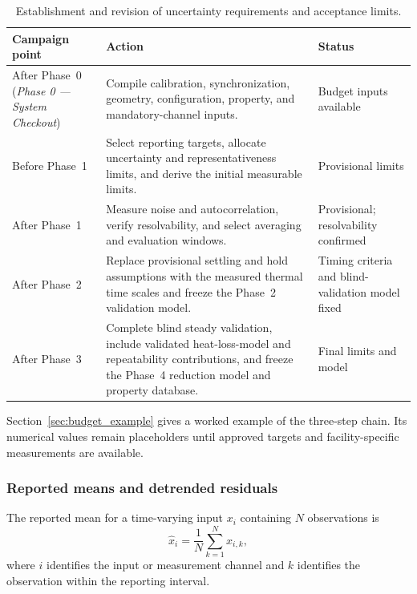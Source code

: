 \documentclass[11pt]{article}
\newcommand{\PhaseZeroDoc}{\textit{Phase 0 --- System Checkout}}
\begin{document}
\begin{table}[H]
    \centering
    \caption{Establishment and revision of uncertainty requirements and acceptance limits.}
    \label{tab:budget_schedule}
    {\small
    \begin{tabularx}{\textwidth}{
        @{}
        >{\raggedright\arraybackslash}p{1.30in}
        >{\raggedright\arraybackslash}X
        >{\raggedright\arraybackslash}p{1.55in}
        @{}
    }
        \toprule
        \textbf{Campaign point} &
        \textbf{Action} &
        \textbf{Status} \\
        \midrule

        After Phase~0 (\PhaseZeroDoc) &
        Compile calibration, synchronization, geometry, configuration, property, and mandatory-channel inputs. &
        Budget inputs available \\

        Before Phase~1 &
        Select reporting targets, allocate uncertainty and representativeness limits, and derive the initial measurable limits. &
        Provisional limits \\

        After Phase~1 &
        Measure noise and autocorrelation, verify resolvability, and select averaging and evaluation windows. &
        Provisional; resolvability confirmed \\

        After Phase~2 &
        Replace provisional settling and hold assumptions with the measured thermal time scales and freeze the Phase~2 validation model. &
        Timing criteria and blind-validation model fixed \\

        After Phase~3 &
        Complete blind steady validation, include validated heat-loss-model and repeatability contributions, and freeze the Phase~4 reduction model and property database. &
        Final limits and model \\

        \bottomrule
    \end{tabularx}}
\end{table}

Section~\ref{sec:budget_example} gives a worked example of the three-step chain. Its numerical values remain placeholders until approved targets and facility-specific measurements are available.

\subsubsection{Reported means and detrended residuals}
The reported mean for a time-varying input $x_i$ containing $N$ observations is
\begin{equation}
    \hat{x}_i
    =
    \frac{1}{N}
    \sum_{k=1}^{N}x_{i,k},
    \label{eq:reported_mean}
\end{equation}
where $i$ identifies the input or measurement channel and $k$ identifies the observation within the reporting interval.
\end{document}
